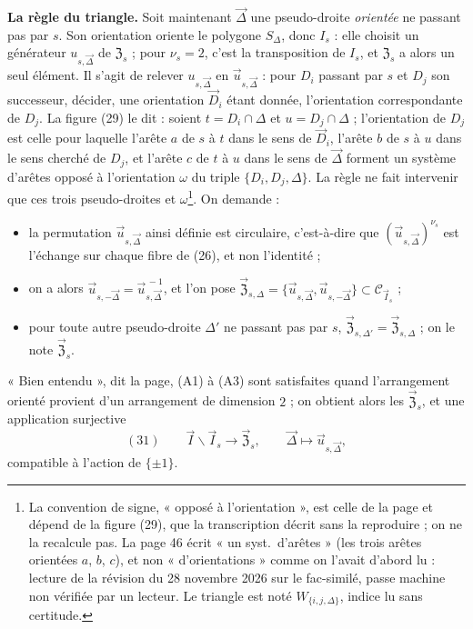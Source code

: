 \documentclass[11pt,a4paper]{article}
\begin{document}
\textbf{La règle du triangle.} Soit maintenant $\vec{\Delta}$ une
pseudo-droite \emph{orientée} ne passant pas par $s$. Son orientation
oriente le polygone $S_\Delta$, donc $I_s$ : elle choisit un générateur
$u_{s,\vec{\Delta}}$ de $\mathfrak{Z}_s$ ; pour $\nu_s = 2$, c'est la
transposition de $I_s$, et $\mathfrak{Z}_s$ a alors un seul élément. Il
s'agit de relever $u_{s,\vec{\Delta}}$ en $\vec{u}_{s,\vec{\Delta}}$ : pour
$D_i$ passant par $s$ et $D_j$ son successeur, décider, une orientation
$\vec{D}_i$ étant donnée, l'orientation correspondante de $D_j$. La figure
(29) le dit : soient $t = D_i \cap \Delta$ et $u = D_j \cap \Delta$ ;
l'orientation de $D_j$ est celle pour laquelle l'arête $a$ de $s$ à $t$ dans
le sens de $\vec{D}_i$, l'arête $b$ de $s$ à $u$ dans le sens cherché de
$D_j$, et l'arête $c$ de $t$ à $u$ dans le sens de $\vec{\Delta}$ forment un
système d'arêtes opposé à l'orientation $\omega$ du triple $\{D_i,
D_j, \Delta\}$. La règle ne fait intervenir que ces trois pseudo-droites et
$\omega$\footnote{La convention de signe, « opposé à l'orientation », est
celle de la page et dépend de la figure (29), que la transcription décrit
sans la reproduire ; on ne la recalcule pas. La page 46 écrit « un syst.\
d'arêtes » (les trois arêtes orientées $a$, $b$, $c$), et non « d'orientations »
comme on l'avait d'abord lu : lecture de la
révision du 28 novembre 2026 sur le fac-similé, passe machine non vérifiée par un lecteur. Le triangle est noté
$W_{\{i, j, \Delta\}}$, indice lu sans certitude.}. On demande :
\begin{itemize}
  \item[(A2)] la permutation $\vec{u}_{s,\vec{\Delta}}$ ainsi définie est
  circulaire, c'est-à-dire que $(\vec{u}_{s,\vec{\Delta}})^{\nu_s}$ est
  l'échange sur chaque fibre de (26), et non l'identité ;
  \item[(30)] on a alors $\vec{u}_{s,-\vec{\Delta}} =
  \vec{u}_{s,\vec{\Delta}}^{\,-1}$, et l'on pose $\vec{\mathfrak{Z}}_{s,\Delta}
  = \{\vec{u}_{s,\vec{\Delta}}, \vec{u}_{s,-\vec{\Delta}}\} \subset
  \mathcal{C}_{\vec{I}_s}$ ;
  \item[(A3)] pour toute autre pseudo-droite $\Delta'$ ne passant pas par
  $s$, $\vec{\mathfrak{Z}}_{s,\Delta'} = \vec{\mathfrak{Z}}_{s,\Delta}$ ; on le
  note $\vec{\mathfrak{Z}}_s$.
\end{itemize}
« Bien entendu », dit la page, (A1) à (A3) sont satisfaites quand
l'arrangement orienté provient d'un arrangement de dimension $2$ ; on
obtient alors les $\vec{\mathfrak{Z}}_s$, et une application surjective
\[
(31) \qquad \vec{I} \smallsetminus \vec{I}_s \longrightarrow
\vec{\mathfrak{Z}}_s, \qquad \vec{\Delta} \longmapsto
\vec{u}_{s,\vec{\Delta}},
\]
compatible à l'action de $\{\pm 1\}$.
\end{document}

